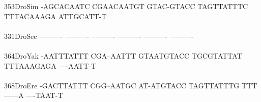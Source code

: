 \documentclass[11pt,twoside,reqno,a4paper]{article}
\begin{document}
{353\hspace*{2\charwidth}DroSim	-AGCACAATC	CGAACAATGT	GTAC-GTACC	TAGTTATTTC	TTTACAAAGA	ATTGCATT-T	\\
\hspace*{5\charwidth}\hspace*{7\charwidth}\hspace*{1\charwidth}\hspace*{1\charwidth}\hspace*{1\charwidth}\hspace*{1\charwidth}\hspace*{1\charwidth}\hspace*{1\charwidth}\\
331\hspace*{2\charwidth}DroSec	----------	----------	----------	----------	----------	----------	\\
\hspace*{5\charwidth}\hspace*{7\charwidth}\hspace*{1\charwidth}\hspace*{1\charwidth}\hspace*{1\charwidth}\hspace*{1\charwidth}\hspace*{1\charwidth}\hspace*{1\charwidth}\\
364\hspace*{2\charwidth}DroYak	-AATTTATTT	CGA--AATTT	GTAATGTACC	TGCGTATTAT	TTTAAAGAGA	----AATT-T	\\
\hspace*{5\charwidth}\hspace*{7\charwidth}\hspace*{1\charwidth}\hspace*{1\charwidth}\hspace*{1\charwidth}\hspace*{1\charwidth}\hspace*{1\charwidth}\hspace*{1\charwidth}\\
368\hspace*{2\charwidth}DroEre	-GACTTATTT	CGG--AATGC	AT-ATGTACC	TAGTTATTTG	TTT------A	----TAAT-T	\\
\hspace*{5\charwidth}\hspace*{7\charwidth}\hspace*{1\charwidth}\hspace*{1\charwidth}\hspace*{1\charwidth}\hspace*{1\charwidth}\hspace*{1\charwidth}\hspace*{1\charwidth}\\
}
\end{document}
